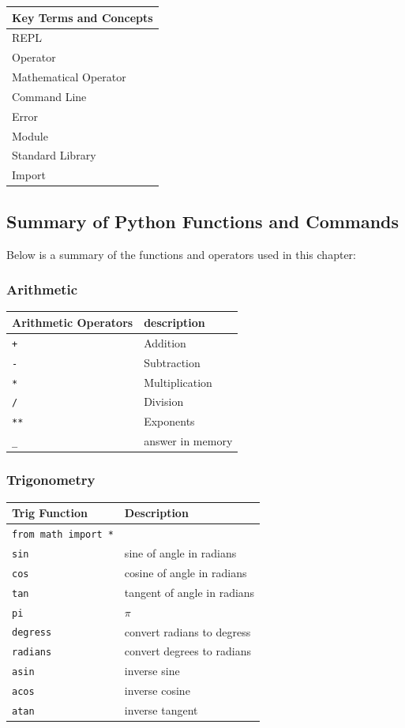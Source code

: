 \documentclass{book}
\begin{document}
\begin{longtable}[]{@{}l@{}}
\toprule
Key Terms and Concepts\tabularnewline
\midrule
\endhead
REPL\tabularnewline
Operator\tabularnewline
Mathematical Operator\tabularnewline
Command Line\tabularnewline
Error\tabularnewline
Module\tabularnewline
Standard Library\tabularnewline
Import\tabularnewline
\bottomrule
\end{longtable}

    \subsection{Summary of Python Functions and
Commands}\label{summary-of-python-functions-and-commands}

Below is a summary of the functions and operators used in this chapter:

\subsubsection{Arithmetic}\label{arithmetic}

\begin{longtable}[]{@{}ll@{}}
\toprule
Arithmetic Operators & description\tabularnewline
\midrule
\endhead
\lstinline!+! & Addition\tabularnewline
\lstinline!-! & Subtraction\tabularnewline
\lstinline!*! & Multiplication\tabularnewline
\lstinline!/! & Division\tabularnewline
\lstinline!**! & Exponents\tabularnewline
\lstinline!_! & answer in memory\tabularnewline
\bottomrule
\end{longtable}

\subsubsection{Trigonometry}\label{trigonometry}

\begin{longtable}[]{@{}ll@{}}
\toprule
Trig Function & Description\tabularnewline
\midrule
\endhead
\lstinline!from math import *! &\tabularnewline
\lstinline!sin! & sine of angle in radians\tabularnewline
\lstinline!cos! & cosine of angle in radians\tabularnewline
\lstinline!tan! & tangent of angle in radians\tabularnewline
\lstinline!pi! & \(\pi\)\tabularnewline
\lstinline!degress! & convert radians to degress\tabularnewline
\lstinline!radians! & convert degrees to radians\tabularnewline
\lstinline!asin! & inverse sine\tabularnewline
\lstinline!acos! & inverse cosine\tabularnewline
\lstinline!atan! & inverse tangent\tabularnewline
\bottomrule
\end{longtable}
\end{document}
